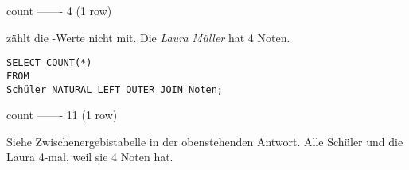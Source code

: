 \documentclass{bschlangaul-aufgabe}
\begin{document}
\begin{enumerate}
\begin{bAntwort}
\begin{bSqlErgebnis}
 count
-------
     4
(1 row)
\end{bSqlErgebnis}

 zählt die -Werte nicht mit. Die \emph{Laura Müller}
hat 4
Noten.
\end{bAntwort}

\begin{verbatim}
SELECT COUNT(*)
FROM
Schüler NATURAL LEFT OUTER JOIN Noten;
\end{verbatim}

\begin{bAntwort}
\begin{bSqlErgebnis}
 count
-------
    11
(1 row)
\end{bSqlErgebnis}
Siehe Zwischenergebistabelle in der obenstehenden Antwort. Alle Schüler
und die Laura 4-mal, weil sie 4 Noten hat.
\end{bAntwort}
\end{enumerate}
\end{document}

